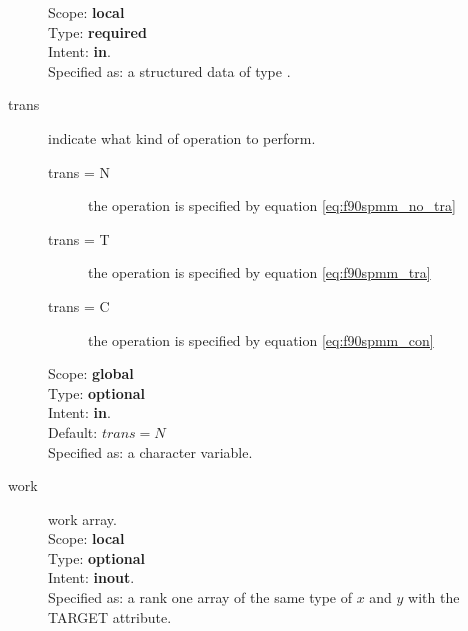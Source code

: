 \begin{description}
Scope: {\bf local} \\
Type: {\bf required}\\
Intent: {\bf in}.\\
Specified as: a structured data of type \descdata.
\item[trans] indicate what kind of operation to perform.
\begin{description}
\item[trans = N] the operation is specified by equation \ref{eq:f90spmm_no_tra}
\item[trans = T] the operation is specified by equation
\ref{eq:f90spmm_tra}
\item[trans = C] the operation is specified by equation
\ref{eq:f90spmm_con}
\end{description}
Scope: {\bf global} \\
Type: {\bf optional}\\	
Intent: {\bf in}.\\
Default: $trans = N$\\	
Specified as: a character variable.

\item[work]  work array.\\
Scope: {\bf local} \\
Type: {\bf optional}\\	
Intent: {\bf inout}.\\
Specified as: a rank one array of the same type of $x$ and $y$ with
the TARGET attribute. 


\end{description}
